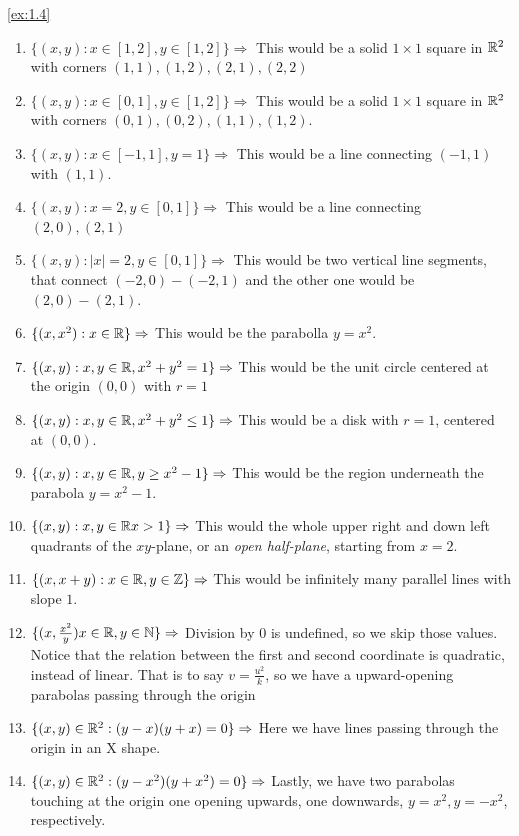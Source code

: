 \begin{solution}\label{sol:1.4}\ref{ex:1.4}
    \begin{enumerate}
        \item[39] $\{ (x,y):x\in[1,2],y\in[1,2] \}\Rightarrow$ This would be a solid $1\times 1$ square in $\mathbb{R}^2$ with corners $(1,1),(1,2),(2,1),(2,2)$
        \item[40] $\{ (x,y):x\in[0,1],y\in[1,2] \}\Rightarrow$ This would be a solid $1\times 1$ square in $\mathbb{R}^2$ with corners $(0,1),(0,2),(1,1),(1,2)$.
        \item[41] $\{ (x,y):x\in[-1,1],y=1 \}\Rightarrow$ This would be a line connecting $(-1,1)$ with $(1,1)$. 
        \item[42] $\{ (x,y):x=2,y\in[0,1] \}\Rightarrow$ This would be a line connecting $(2,0),(2,1)$    
        \item[43] $\{ (x,y):\lvert x \rvert=2,y\in[0,1] \}\Rightarrow$ This would be two vertical line segments, that connect $(-2,0)-(-2,1)$ and the other one would be $(2,0)-(2,1)$.
        \item[44] $\{ (x,x^2):x\in\mathbb{R} \}\Rightarrow$ This would be the parabolla $y=x^2$.
        \item[45] $\{ (x,y):x,y\in\mathbb{R},x^2+y^2=1 \}\Rightarrow$ This would be the unit circle centered at the origin $(0,0)$ with $r=1$
        \item[46] $\{ (x,y):x,y\in\mathbb{R},x^2+y^2\le 1 \}\Rightarrow$ This would be a disk with $r=1$, centered at $(0,0)$.
        \item[47] $\{ (x,y):x,y\in\mathbb{R}, y\ge x^2-1 \}\Rightarrow$ This would be the region underneath the parabola $y=x^2-1$.
        \item[48] $\{ (x,y):x,y\in\mathbb{R} x>1 \}\Rightarrow$ This would the whole upper right and down left quadrants of the $xy$-plane, or an \emph{open half-plane}, starting from $x=2$. 
        \item[49] $\{ (x,x+y):x\in\mathbb{R},y\in\mathbb{Z} \}\Rightarrow$ This would be infinitely many parallel lines with slope $1$.
        \item[50] $\{ (x,\frac{x^2}{y})x\in\mathbb{R},y\in\mathbb{N}\}\Rightarrow$ Division by $0$ is undefined, so we skip those values. Notice that the relation between the first and second coordinate is quadratic, instead of linear. That is to say $v=\frac{u^2}{k}$, so we have a upward-opening parabolas passing through the origin 
        \item[51] $\{ (x,y)\in\mathbb{R}^2:(y-x)(y+x)=0 \}\Rightarrow$ Here we have lines passing through the origin in an X shape. 
        \item[52] $\{ (x,y)\in\mathbb{R}^2:(y-x^2)(y+x^2)=0 \}\Rightarrow$ Lastly, we have two parabolas touching at the origin one opening upwards, one downwards, $y=x^2, y=-x^2$, respectively.

\end{enumerate}
\end{solution}
